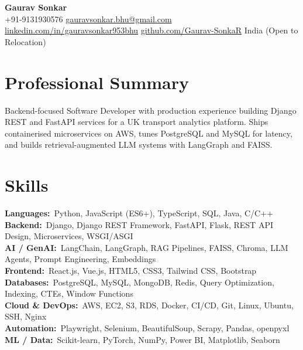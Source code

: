 \documentclass[10pt,a4paper]{article}
\begin{document}
\begin{center}
{\LARGE\bfseries Gaurav Sonkar}\\[3pt]
{\small
+91-9131930576 \quad\textbar\quad
\href{mailto:gauravsonkar.bhu@gmail.com}{gauravsonkar.bhu@gmail.com} \quad\textbar\quad
\href{https://linkedin.com/in/gauravsonkar953bhu}{linkedin.com/in/gauravsonkar953bhu} \quad\textbar\quad
\href{https://github.com/Gaurav-SonkaR}{github.com/Gaurav-SonkaR} \quad\textbar\quad
India (Open to Relocation)
}
\end{center}
\vspace{2pt}

\section{Professional Summary}
{\small
Backend-focused Software Developer with production experience building Django REST and FastAPI services for a UK transport analytics platform. Ships containerised microservices on AWS, tunes PostgreSQL and MySQL for latency, and builds retrieval-augmented LLM systems with LangGraph and FAISS.
}

\section{Skills}
{\small
\noindent\textbf{Languages:}\ Python, JavaScript (ES6+), TypeScript, SQL, Java, C/C++\\
\noindent\textbf{Backend:}\ Django, Django REST Framework, FastAPI, Flask, REST API Design, Microservices, WSGI/ASGI\\
\noindent\textbf{AI / GenAI:}\ LangChain, LangGraph, RAG Pipelines, FAISS, Chroma, LLM Agents, Prompt Engineering, Embeddings\\
\noindent\textbf{Frontend:}\ React.js, Vue.js, HTML5, CSS3, Tailwind CSS, Bootstrap\\
\noindent\textbf{Databases:}\ PostgreSQL, MySQL, MongoDB, Redis, Query Optimization, Indexing, CTEs, Window Functions\\
\noindent\textbf{Cloud \& DevOps:}\ AWS, EC2, S3, RDS, Docker, CI/CD, Git, Linux, Ubuntu, SSH, Nginx\\
\noindent\textbf{Automation:}\ Playwright, Selenium, BeautifulSoup, Scrapy, Pandas, openpyxl\\
\noindent\textbf{ML / Data:}\ Scikit-learn, PyTorch, NumPy, Power BI, Matplotlib, Seaborn
}
\end{document}
